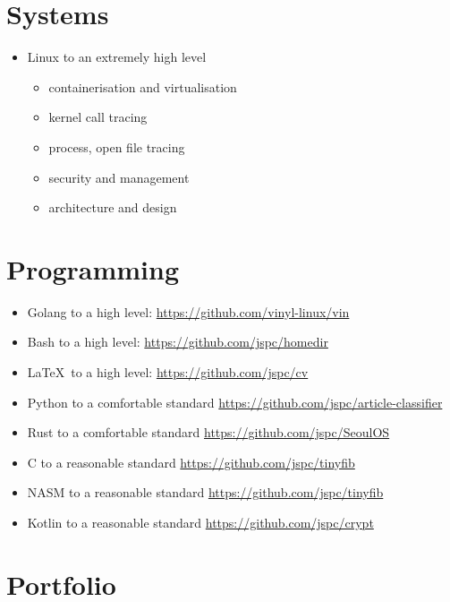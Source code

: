 \documentclass[11pt,a4paper,sans]{article}
\begin{document}
\section{Systems}

\begin{itemize}
\item Linux to an extremely high level
  \begin{itemize}
  \item containerisation and virtualisation
  \item kernel call tracing
  \item process, open file tracing
  \item security and management
  \item architecture and design
  \end{itemize}
\end{itemize}

\section{Programming}

\begin{itemize}
\item Golang to a high level: \href{https://github.com/vinyl-linux/vin}{https://github.com/vinyl-linux/vin}
\item Bash to a high level: \href{https://github.com/jspc/homedir}{https://github.com/jspc/homedir}
\item \LaTeX \ to a high level: \href{https://github.com/jspc/cv}{https://github.com/jspc/cv}
\item Python to a comfortable standard \href{https://github.com/jspc/article-classifier}{https://github.com/jspc/article-classifier}
\item Rust to a comfortable standard \href{https://github.com/jspc/SeoulOS}{https://github.com/jspc/SeoulOS}
\item C to a reasonable standard \href{https://github.com/jspc/tinyfib}{https://github.com/jspc/tinyfib}
\item NASM to a reasonable standard \href{https://github.com/jspc/tinyfib}{https://github.com/jspc/tinyfib}
\item Kotlin to a reasonable standard \href{https://github.com/jspc/crypt}{https://github.com/jspc/crypt}
\end{itemize}


\section{Portfolio}
\end{document}

